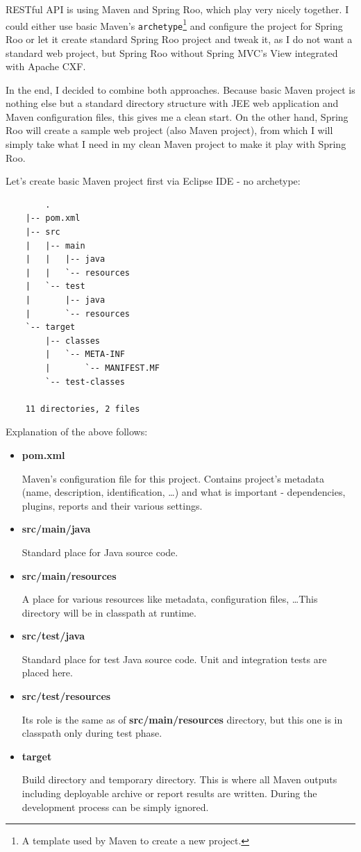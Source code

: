 	RESTful API is using Maven and Spring Roo, which play very nicely together. I could either use basic Maven's
	\verb|archetype|\footnote{A template used by Maven to create a new project.} and configure the project for Spring Roo
	or let it create standard Spring Roo project and tweak it, as I do not want a standard web project, but Spring Roo
	without Spring MVC's View integrated with Apache CXF.
	
	In the end, I decided to combine both approaches. Because basic Maven project is nothing else but a standard directory
	structure with JEE web application and Maven configuration files, this gives me a clean start. On the other hand,
	Spring Roo will create a sample web project (also Maven project), from which I will simply take what I need in my clean
	Maven project to make it play with Spring Roo.
	
	Let's create basic Maven project first via Eclipse IDE - no archetype:
	
	\begin{verbatim}
		.
	|-- pom.xml
	|-- src
	|   |-- main
	|   |   |-- java
	|   |   `-- resources
	|   `-- test
	|       |-- java
	|       `-- resources
	`-- target
	    |-- classes
	    |   `-- META-INF
	    |       `-- MANIFEST.MF
	    `-- test-classes
	
	11 directories, 2 files
	\end{verbatim}
	
	Explanation of the above follows:
	
	\begin{itemize}
		\item \textbf{pom.xml} 
		
		Maven's configuration file for this project. Contains project's metadata (name, description, identification, \ldots)
		and what is important - dependencies, plugins, reports and their various settings.
		\item \textbf{src/main/java}
		
		Standard place for Java source code.
		\item \textbf{src/main/resources}
		
		A place for various resources like metadata, configuration files, \ldots This directory will be in classpath at
		runtime.
		\item \textbf{src/test/java}
		
		Standard place for test Java source code. Unit and integration tests are placed here.
		\item \textbf{src/test/resources}
		
		Its role is the same as of \textbf{src/main/resources} directory, but this one is in classpath only during test
		phase.
		\item \textbf{target}
		
		Build directory and temporary directory. This is where all Maven outputs including deployable archive or report
		results are written. During the development process can be simply ignored.
	\end{itemize}
	
